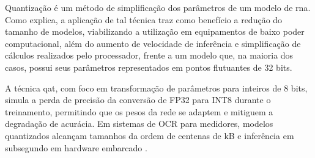 Quantização é um método de simplificação dos parâmetros de um modelo de \gls{rna}. 
Como  explica, a aplicação de tal técnica 
traz como benefício a redução do tamanho de modelos, 
viabilizando a utilização em equipamentos de baixo poder computacional, 
além do aumento de velocidade de inferência e simplificação de cálculos realizados pelo processador, 
frente a um modelo que, na maioria dos casos, possui seus parâmetros representados em pontos 
flutuantes de 32 bits. 

A técnica \gls{qat}, com foco em transformação de parâmetros para inteiros de 8 bits,
simula a perda de precisão da conversão de FP32 para INT8 durante o treinamento, 
permitindo que os pesos da rede se adaptem e mitiguem a degradação de acurácia.
Em sistemas de OCR para medidores, 
modelos quantizados alcançam tamanhos da ordem de centenas de kB e 
inferência em subsegundo em hardware embarcado 
\cite{ademola2023resource, jawas2018water}.

